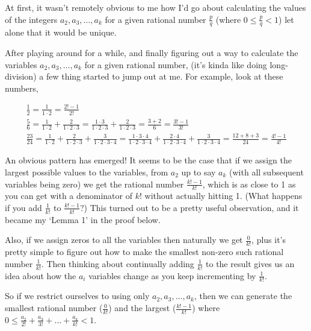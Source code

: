 \documentclass{article}
\begin{document}
At first, it wasn't remotely obvious to me how I'd go about calculating
the values of the integers \(a_2, a_3, \dots{}, a_k\) for a given rational number
\(\frac{p}{q}\)
(where
\(0 \le{} \frac{p}{q} < 1\))
let alone that it would be unique.

After playing around for a while, and finally figuring out
a way to calculate the variables \(a_2, a_3, \dots{}, a_k\)
for a given rational number,
(it's kinda like doing long-division)
a few thing started to jump out at me.
For example, look at these numbers,

{\small
\bgroup
\setlength{\abovedisplayskip}{0pt}
\setlength{\belowdisplayskip}{0pt}
\begin{gather*}
\frac{1}{2}
= \frac{1}{1\cdot{}2}
= \frac{2!-1}{2!}\\
\frac{5}{6}
= \frac{1}{1\cdot{}2}
+ \frac{2}{1\cdot{}2\cdot{}3}
= \frac{1\cdot{}3}{1\cdot{}2\cdot{}3}
+ \frac{2}{1\cdot{}2\cdot{}3}
= \frac{3+2}{6}
= \frac{3!-1}{3!}\\
\frac{23}{24}
= \frac{1}{1\cdot{}2}
+ \frac{2}{1\cdot{}2\cdot{}3}
+ \frac{3}{1\cdot{}2\cdot{}3\cdot{}4}
= \frac{1\cdot{}3\cdot{}4}{1\cdot{}2\cdot{}3\cdot{}4}
+ \frac{2\cdot{}4}{1\cdot{}2\cdot{}3\cdot{}4}
+ \frac{3}{1\cdot{}2\cdot{}3\cdot{}4}
= \frac{12+8+3}{24}
= \frac{4!-1}{4!}
\end{gather*}
\egroup
}

An obvious pattern has emerged!
It seems to be the case
that if we assign the largest possible values to the variables,
from \(a_2\) up to say \(a_k\) (with all subsequent variables being zero)
we get the rational number \(\frac{k!-1}{k!}\),
which is as close to 1 as you can get with a denominator of \(k!\) without actually
hitting 1. (What happens if you add \(\frac{1}{k!}\) to \(\frac{k!-1}{k!}\)?)
This turned out to be
a pretty useful observation, and it became my `Lemma 1' in the proof below.

Also, if we assign zeros to all the variables then naturally we get \(\frac{0}{k!}\), plus
it's pretty simple to figure out how to make the smallest non-zero such rational number \(\frac{1}{k!}\).
Then thinking about continually adding \(\frac{1}{k!}\) to the result gives us an idea about how the
\(a_i\) variables change as you keep incrementing by \(\frac{1}{k!}\).

So if we restrict ourselves to using only \(a_2, a_3, \dots{}, a_k\), then we
can generate the smallest rational number (\(\frac{0}{k!}\)) and the largest
(\(\frac{k!-1}{k!}\)) where
\(0 \le{} \frac{a_2}{2!} + \frac{a_3}{3!} + \dots{} + \frac{a_k}{k!} < 1\).
\end{document}

